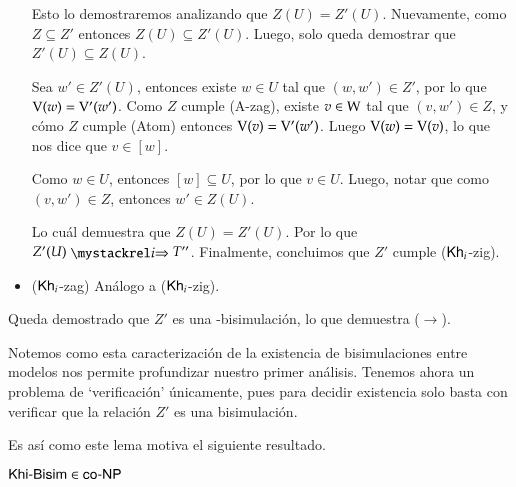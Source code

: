 \begin{demostracion}
\begin{itemize}
        Esto lo demostraremos analizando que $Z(U) = Z'(U)$. Nuevamente, como $Z \subseteq Z'$
        entonces $Z(U) \subseteq Z'(U)$. Luego, solo queda demostrar que $Z'(U) \subseteq Z(U)$.
    
        Sea $w' \in Z'(U)$, entonces existe $w \in U$ tal que $(w,w') \in Z'$, por lo que $\mathrm{V}(w) = \mathrm{V}'(w')$. 
        Como $Z$ cumple (A-zag), existe $v \in \mathrm{W}$ tal que $(v,w') \in Z$, y cómo $Z$ cumple 
        (Atom) entonces $\mathrm{V}(v) = \mathrm{V}'(w')$. Luego $\mathrm{V}(w) = \mathrm{V}(v)$, lo que nos dice que $v \in [w]$.
    
        Como $w \in U$, entonces $[w] \subseteq U$, por lo que $v \in U$. Luego, notar que como $(v,w') \in Z$, entonces
        $w' \in Z(U)$.
    
        Lo cuál demuestra que $Z(U) = Z'(U)$. Por lo que $Z'(U) \ultsExecAgi T''$. Finalmente, concluimos 
        que $Z'$ cumple ($\mathsf{Kh}_i$-zig).
    
    
        \item ($\mathsf{Kh}_i$-zag) Análogo a ($\mathsf{Kh}_i$-zig).
    \end{itemize}
    Queda demostrado que $Z'$ es una \KHilogic-bisimulación, lo que demuestra ($\rightarrow$).
\end{demostracion}

Notemos como esta caracterización de la existencia de bisimulaciones entre modelos
nos permite profundizar nuestro primer análisis. Tenemos ahora un problema de `verificación'
únicamente, pues para decidir existencia solo basta con verificar que la relación $Z'$ es una bisimulación.

Es así como este lema motiva el siguiente resultado. 


\begin{lema}
    $\rm\textsf{Khi-Bisim} \in \rm\textsf{co-NP}$ 
\end{lema}

